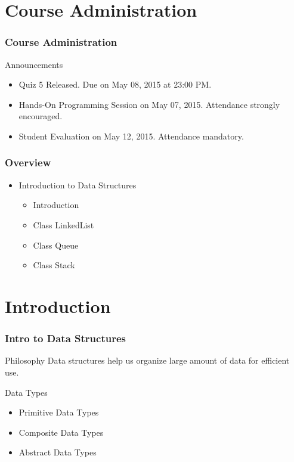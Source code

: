 \documentclass[10pt, compress]{beamer}
\begin{document}
\prepareCover

\section{Course Administration}

\begin{frame}[fragile]
\frametitle{Course Administration}
	\begin{block}{Announcements}
		\begin{itemize}
			\item[] Quiz 5 Released. Due on May 08, 2015 at 23:00 PM.
			\item[] Hands-On Programming Session on May 07, 2015. Attendance strongly encouraged.
			\item[] Student Evaluation on May 12, 2015. Attendance mandatory.
		\end{itemize}
	\end{block}
\end{frame}

\begin{frame}[fragile]
	\frametitle{Overview}
	\begin{itemize}
		\item[] Introduction to Data Structures
		\begin{itemize}
			\item[] Introduction
			\item[] Class LinkedList
			\item[] Class Queue
			\item[] Class Stack
		\end{itemize}
	\end{itemize}
\end{frame}


\section{Introduction}

\begin{frame}[fragile]
	\frametitle{Intro to Data Structures}
	\begin{block}{Philosophy}
	Data structures help us organize large amount of data for efficient use.
	\end{block}
	\begin{block}{Data Types}
		\begin{itemize}
			\item[] Primitive Data Types
			\item[] Composite Data Types
			\item[] Abstract Data Types
		\end{itemize}
	\end{block}
\end{frame}
\end{document}

